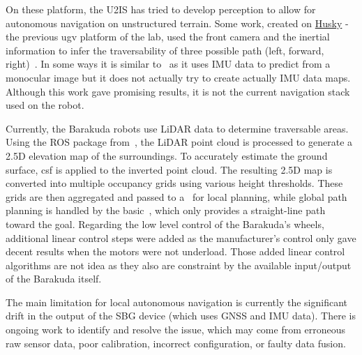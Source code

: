 On these platform, the U2IS has tried to develop perception to allow for autonomous navigation on unstructured terrain.
Some work, created on \href{https://clearpathrobotics.com/husky-a300-unmanned-ground-vehicle-robot/}{Husky} - the previous
\gls{ugv} platform of the lab, used the front camera and the inertial information to infer the traversability of three
possible path (left, forward, right)~\parencite{thomas_whojospatially-coherent-costmap_2024}.
In some ways it is similar to~\cite{fortin_uav-assisted_2024} as it uses IMU data to predict from a monocular image but
it does not actually try to create actually IMU data maps.\\
Although this work gave promising results, it is not the current navigation stack used on the robot.

Currently, the Barakuda robots use LiDAR data to determine traversable areas.
Using the ROS package from~\cite{miki_elevation_2022}, the LiDAR point cloud is processed to generate a 2.5D elevation map of the surroundings.
To accurately estimate the ground surface, \gls{csf} is applied to the inverted point cloud.
The resulting 2.5D map is converted into multiple occupancy grids using various height thresholds.
These grids are then aggregated and passed to a~\cite{noauthor_teb_local_planner_nodate} for local planning, while
global path planning is handled by the basic~\cite{noauthor_carrot_planner_nodate}, which only provides a straight-line path toward the goal.
Regarding the low level control of the Barakuda's wheels, additional linear control steps were added as the manufacturer's
control only gave decent results when the motors were not underload.
Those added linear control algorithms are not idea as they also are constraint by the available input/output of the
Barakuda itself.

The main limitation for local autonomous navigation is currently the significant drift in the output of the SBG device (which uses GNSS and IMU data).
There is ongoing work to identify and resolve the issue, which may come from erroneous raw sensor data, poor calibration, incorrect configuration, or faulty data fusion.


